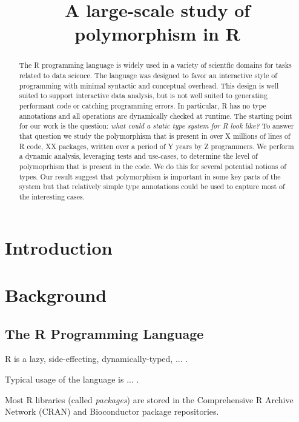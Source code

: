\documentclass[acmsmall,10pt,review,anonymous]{acmart}\settopmatter{printfolios=true,printccs=false,printacmref=false}
\begin{document}
\title{A large-scale study of polymorphism in R}

\begin{abstract}
The R programming language is widely used in a variety of scientfic domains
for tasks related to data science. The language was designed to favor an
interactive style of programming with minimal syntactic and conceptual
overhead. This design is well suited to support interactive data analysis,
but is not well suited to generating performant code or catching programming
errors.  In particular, R has no type annotations and all operations are
dynamically checked at runtime. The starting point for our work is the
question: \emph{what could a static type system for R look like?}  To answer
that question we study the polymorphism that is present in over X millions
of lines of R code, XX packages, written over a period of Y years by Z
programmers.  We perform a dynamic analysis, leveraging tests and use-cases,
to determine the level of polymoprhism that is present in the code. We do
this for several potential notions of types. Our result suggest that
polymorphism is important in some key parts of the system but that
relatively simple type annotations could be used to capture most of the
interesting cases.
\end{abstract}
\maketitle

\section{Introduction}


%
%
%
\section{Background}

%
%
%
%
\subsection{The R Programming Language}

R is a lazy, side-effecting, dynamically-typed, ... .

Typical usage of the language is ... . 

Most R libraries (called \textit{packages}) are stored in the Comprehensive R Archive Network (CRAN) and Bioconductor package repositories.
\end{document}
